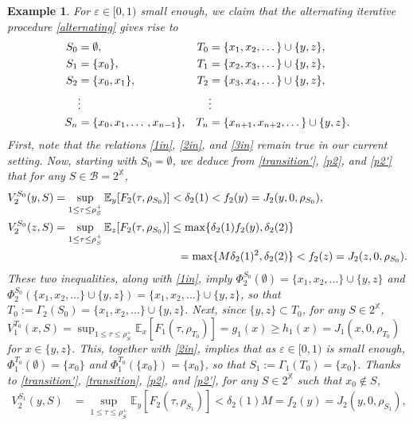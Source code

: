 \documentclass[11pt,reqno]{article}
\numberwithin{equation}{section}
\newtheorem{example}{Example}[section]
\newcommand{\E}{\mathbb{E}}
\newcommand{\X}{\mathbb{X}}
\newcommand{\B}{\mathcal{B}}
\newcommand{\eps}{\varepsilon}
\begin{document}
\begin{example}
For $\eps\in [0,1)$ small enough, we claim that the alternating iterative procedure \eqref{alternating} gives rise to 
\begin{align}
S_0&=\emptyset,& T_0&=\{x_1,x_2,\dotso\}\cup\{y,z\},\notag\\
S_1&=\{x_0\},& T_1&=\{x_2,x_3,\dotso\}\cup\{y,z\},\notag\\
S_2&=\{x_0,x_1\},& T_2&=\{x_3,x_4,\dotso\}\cup\{y,z\},\label{eg2 S_n T_n}\\
&\vdots& &\vdots\notag\\
S_n&=\{x_0,x_1,\dotso,x_{n-1}\},&T_n&=\{x_{n+1},x_{n+2},\dotso\}\cup\{y,z\}.\notag
\end{align}
First, note that the relations \eqref{1in}, \eqref{2in}, and \eqref{3in} remain true in our current setting. Now, starting with $S_0=\emptyset$, we deduce from \eqref{transition'}, \eqref{p2}, and \eqref{p2'} that for any $S\in \B=2^\X$, 
\begin{align*}
V^{S_0}_2(y,S) &= \sup_{1\le \tau\le \rho^+_S} \E_{y}[F_2(\tau,\rho_{S_0})] <\delta_2(1)<f_2(y)=J_2(y,0,\rho_{S_0}),\\
V^{S_0}_2(z,S) &= \sup_{1\le \tau\le \rho^+_S} \E_{z}[F_2(\tau,\rho_{S_0})] \le \max\{\delta_2(1) f_2(y), \delta_2(2)\}\\
&\hspace{1.55in} =\max\{M \delta_2(1)^2, \delta_2(2)\}< f_2(z)=J_2(z,0,\rho_{S_0}).
\end{align*}
These two inequalities, along with \eqref{1in}, imply $\Phi^{S_0}_2(\emptyset) = \{x_1,x_2,...\}\cup\{y,z\}$ and $\Phi^{S_0}_2(\{x_1,x_2,...\}\cup\{y,z\}) = \{x_1,x_2,...\}\cup\{y,z\}$, so that $T_0 := \Gamma_2(S_0)=\{x_1,x_2,...\}\cup\{y,z\}$. Next, since $\{y,z\}\subset T_0$, for any $S\in 2^\X$, $V^{T_0}_1(x,S) = \sup_{1\le \tau\le \rho^+_S} \E_{x}[F_1(\tau,\rho_{T_0})] = g_1(x)\ge h_1(x) = J_1(x,0,\rho_{T_0})$ for $x\in\{y,z\}$. 
This, together with \eqref{2in}, implies that as $\eps\in[0,1)$ is small enough, $\Phi^{T_0}_1(\emptyset) = \{x_0\}$ and $\Phi^{T_0}_1(\{x_0\}) = \{x_0\}$, so that $S_1 := \Gamma_1(T_0)=\{x_0\}$.
Thanks to \eqref{transition'}, \eqref{transition}, \eqref{p2}, and \eqref{p2'}, for any $S\in 2^\X$ such that $x_0\notin S$, 
\begin{align*}
V^{S_1}_2(y,S)& = \sup_{1\le \tau\le \rho^+_S} \E_{y}[F_2(\tau,\rho_{S_1})]<\delta_2(1) M=f_2(y) = J_2(y,0,\rho_{S_1}),\\

\end{align*}
\end{example}
\end{document}
